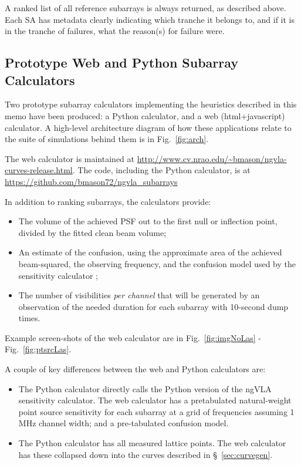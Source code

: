 \documentclass[11pt]{article}
\begin{document}
A ranked list of all reference subarrays is always returned, as
described above.  Each SA has metadata clearly indicating which
tranche it belongs to, and if it is in the tranche of failures, what
the reason(s) for failure were.

\subsection{Prototype Web and Python Subarray Calculators}
\label{sec:code}

Two prototype subarray calculators implementing the heuristics
described in this memo have been produced: a Python calculator, and a
web (html+javascript) calculator.  A high-level architecture diagram of how these
applications relate to the suite of simulations behind them is in
Fig.~\ref{fig:arch}.

The web calculator is maintained at
\url{http://www.cv.nrao.edu/~bmason/ngvla-curves-release.html}.
The code, including the Python calculator, is at
\url{https://github.com/bmason72/ngvla_subarrays}

In addition to ranking subarrays, the calculators provide:
\begin{itemize}
\item The volume of the achieved PSF out to the first null or inflection point,
  divided by the fitted clean beam volume;
\item An estimate of the confusion, using the approximate area of the achieved
  beam-squared, the observing frequency, and the confusion model used by
  the sensitivity calculator \citep{condon2012,matthews2021};
\item  The number of visibilities {\it per channel} that will be generated
  by an observation of the needed duration for each subarray with 10-second dump times.
\end{itemize}
Example screen-shots of the web calculator are in Fig.~\ref{fig:imgNoLas} - Fig.~\ref{fig:ptsrcLas}.

A couple of key differences between the web and Python calculators are:
\begin{itemize}
\item The Python calculator directly calls the Python version of the
  ngVLA sensitivity calculator. The web calculator has a pretabulated
  natural-weight point source sensitivity for each subarray at a grid
  of frequencies assuming 1 MHz channel width; and a pre-tabulated
  confusion model.
\item The Python calculator has all measured lattice points. The web
  calculator has these collapsed down into the curves described
  in \S~\ref{sec:curvegen}.
\end{itemize}
\end{document}

